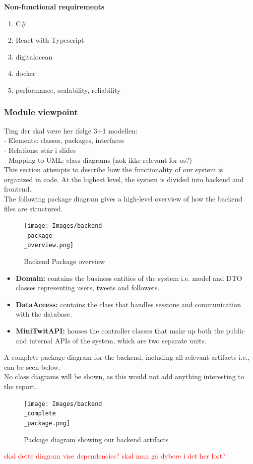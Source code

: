 \noindent
\textbf{Non-functional requirements}
\begin{enumerate}
    \item C\# 
    \item React with Typescript 
    \item digitalocean
    \item docker
    \item performance, scalability, reliability
\end{enumerate}


    
    
\subsubsection{Module viewpoint}
Ting der skal være her ifølge 3+1 modellen: \\
- Elements: classes, packages, interfaces \\
- Relations: står i slides \\
- Mapping to UML: class diagrams (nok ikke relevant for os?) \\


This section attempts to describe how the functionality of our system is organized in code. 
At the highest level, the system is divided into backend and frontend.\\

The following package diagram gives a high-level overview of how the backend files are structured.
\begin{figure}[H]
 \centering
 \texttt{[image: Images/backend\\\_package\\\_overview.png]}
 \caption{Backend Package overview}
 \label{fig:BackendPackageDiagram}
\end{figure}
\begin{itemize}
    \item \textbf{Domain:} contains the business entities of the system i.e. model and DTO classes representing users, tweets and followers.
    \item \textbf{DataAccess:} contains the class that handles sessions and communication with the database.
    \item \textbf{MiniTwitAPI:} houses the controller classes that make up both the public and internal APIs of the system, which are two separate units. 
\end{itemize}
A complete package diagram for the backend, including all relevant artifacts i.e., can be seen below. \\
No class diagrams will be shown, as this would not add anything interesting to the report. \\
\begin{figure}[H]
 \centering
 \texttt{[image: Images/backend\\\_complete\\\_package.png]}
 \caption{Package diagram showing our backend artifacts}
 \label{fig:BackendCompletePackageDiagram}
\end{figure}
\textcolor{red}{skal dette diagram vise dependencies?}
\textcolor{red}{skal man gå dybere i det her lort?} \\

